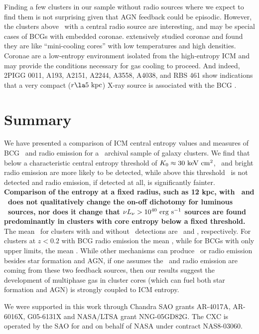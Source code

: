 \documentclass[12pt,preprint]{aastex}
\begin{document}
Finding a few clusters in our sample without radio sources where we
expect to find them is not surprising given that AGN feedback could be
episodic. However, the clusters above \kthr\ with a central radio
source are interesting, and may be special cases of BCGs with embedded
coronae. \cite{coronae} extensively studied coronae and found they are
like ``mini-cooling cores'' with low temperatures and high
densities. Coronae are a low-entropy environment isolated from the
high-entropy ICM and may provide the conditions necessary for gas
cooling to proceed. And indeed, 2PIGG 0011, A193, A2151, A2244, A3558,
A4038, and RBS 461 show indications that a very compact ($r \la
5\kpc$) X-ray source is associated with the BCG \citep{accept}.

\section{Summary}
\label{sec:diss}

We have presented a comparison of ICM central entropy values and
measures of BCG \halpha\ and radio emission for a \Chandra\ archival
sample of galaxy clusters. We find that below a characteristic central
entropy threshold of $K_0 \approx 30 \mathrm{\mbox{\ensuremath{\mathrm{~keV}}} \mathrm{\mbox{\ensuremath{\mathrm{~cm}}}^2}}$, \halpha\ and bright radio
emission are more likely to be detected, while above this threshold
\halpha\ is not detected and radio emission, if detected at all, is
significantly fainter. {\bf{Comparison of the entropy at a fixed
    radius, such as 12 kpc, with \lha\ and \radpow\ does not
    qualitatively change the on-off dichotomy for luminous
    \halpha\ sources, nor does it change that $\nu L_{\nu} > 10^{40}
    \mathrm{\mbox{\ensuremath{\mathrm{~erg}}} \mathrm{\mbox{\ensuremath{\mathrm{~s}}}^{-1}}}$ sources are found predominantly in clusters with core
    entropy below a fixed threshold.}} The mean \kna\ for clusters
with and without \halpha\ detections are \fha\ and \nfha,
respectively. For clusters at $z < 0.2$ with BCG radio emission the
mean \frad, while for BCGs with only upper limits, the mean
\nfrad. While other mechanisms can produce \halpha\ or radio emission
besides star formation and AGN, if one assumes the \halpha\ and radio
emission are coming from these two feedback sources, then our results
suggest the development of multiphase gas in cluster cores (which can
fuel both star formation and AGN) is strongly coupled to ICM entropy.

\acknowledgements
We were supported in this work through Chandra SAO grants AR-4017A,
AR-6016X, G05-6131X and NASA/LTSA grant NNG-05GD82G. The CXC is
operated by the SAO for and on behalf of NASA under contract
NAS8-03060.
\end{document}
